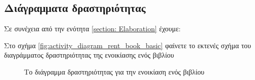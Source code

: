 \documentclass{assignment}
\begin{document}
\subsection{Διάγραμματα δραστηριότητας}

Σε συνέχεια από την ενότητα \ref{section: Elaboration} έχουμε:

Στο σχήμα \ref{fig:activity_diagram_rent_book_basic} φαίνετε το εκτενές σχήμα του διαγράμματος δραστηριότητας της ενοικίασης ενός βιβλίου

\begin{figure}
\begin{center}
\caption{Το διάγραμμα δραστηριότητας για την ενοικίαση ενός βιβλίου}
\label{fig:activity_diagram_rent_book_extended}
\end{center}
\end{figure}
\end{document}
